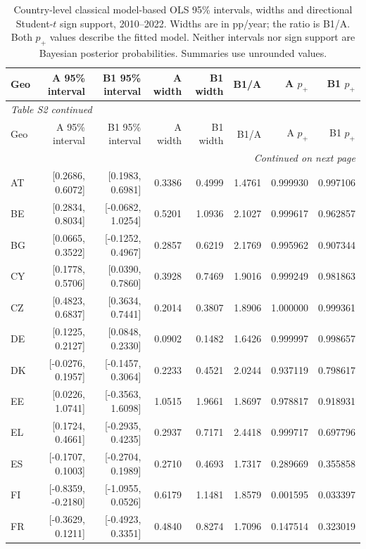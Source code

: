 \begingroup
\footnotesize
\setlength{\tabcolsep}{4pt}
\setlength{\LTcapwidth}{\linewidth}
\renewcommand{\arraystretch}{1.1}
\begin{longtable}{lrrrrrrr}
\caption{Country-level classical model-based OLS 95\% intervals, widths and directional Student-$t$ sign support, 2010--2022. Widths are in pp/year; the ratio is B1/A. Both $p_+$ values describe the fitted model. Neither intervals nor sign support are Bayesian posterior probabilities. Summaries use unrounded values.}\label{tab:S2} \\
\toprule
Geo & A 95\% interval & B1 95\% interval & A width & B1 width & B1/A & A $p_+$ & B1 $p_+$ \\
\midrule
\endfirsthead
\multicolumn{8}{l}{\textit{Table S2 continued}} \\
\toprule
Geo & A 95\% interval & B1 95\% interval & A width & B1 width & B1/A & A $p_+$ & B1 $p_+$ \\
\midrule
\endhead
\midrule
\multicolumn{8}{r}{\textit{Continued on next page}} \\
\endfoot
\bottomrule
\endlastfoot
AT & [0.2686, 0.6072] & [0.1983, 0.6981] & 0.3386 & 0.4999 & 1.4761 & 0.999930 & 0.997106 \\
BE & [0.2834, 0.8034] & [-0.0682, 1.0254] & 0.5201 & 1.0936 & 2.1027 & 0.999617 & 0.962857 \\
BG & [0.0665, 0.3522] & [-0.1252, 0.4967] & 0.2857 & 0.6219 & 2.1769 & 0.995962 & 0.907344 \\
CY & [0.1778, 0.5706] & [0.0390, 0.7860] & 0.3928 & 0.7469 & 1.9016 & 0.999249 & 0.981863 \\
CZ & [0.4823, 0.6837] & [0.3634, 0.7441] & 0.2014 & 0.3807 & 1.8906 & 1.000000 & 0.999361 \\
DE & [0.1225, 0.2127] & [0.0848, 0.2330] & 0.0902 & 0.1482 & 1.6426 & 0.999997 & 0.998657 \\
DK & [-0.0276, 0.1957] & [-0.1457, 0.3064] & 0.2233 & 0.4521 & 2.0244 & 0.937119 & 0.798617 \\
EE & [0.0226, 1.0741] & [-0.3563, 1.6098] & 1.0515 & 1.9661 & 1.8697 & 0.978817 & 0.918931 \\
EL & [0.1724, 0.4661] & [-0.2935, 0.4235] & 0.2937 & 0.7171 & 2.4418 & 0.999717 & 0.697796 \\
ES & [-0.1707, 0.1003] & [-0.2704, 0.1989] & 0.2710 & 0.4693 & 1.7317 & 0.289669 & 0.355858 \\
FI & [-0.8359, -0.2180] & [-1.0955, 0.0526] & 0.6179 & 1.1481 & 1.8579 & 0.001595 & 0.033397 \\
FR & [-0.3629, 0.1211] & [-0.4923, 0.3351] & 0.4840 & 0.8274 & 1.7096 & 0.147514 & 0.323019 \\

\end{longtable}
